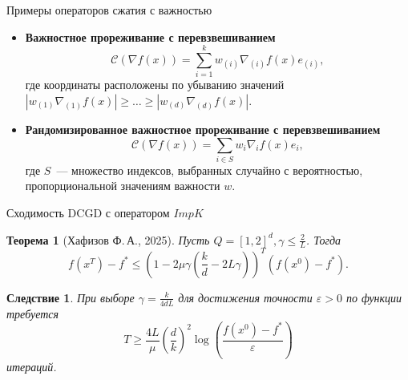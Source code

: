\documentclass{beamer}
\newtheorem{mytheorem}{Теорема}
\newtheorem{mycorollary}{Следствие}
\begin{document}
\begin{frame}{Примеры операторов сжатия с важностью}
    \begin{itemize}
        \item \textbf{Важностное прореживание с перевзвешиванием}\\
        \begin{equation}
            \mathcal{C}(\nabla f(x)) = \sum_{i=1}^k w_{(i)} \nabla_{(i)} f(x) e_{(i)},
        \end{equation}
        где координаты расположены по убыванию значений $|w_{(1)} \nabla_{(1)} f(x)| \geq \dots \geq |w_{(d)} \nabla_{(d)} f(x)|$.
        \item \textbf{Рандомизированное важностное прореживание с перевзвешиванием}\\
        \begin{equation}
            \mathcal{C}(\nabla f(x)) = \sum_{i \in S} w_i \nabla_i f(x) e_i,
        \end{equation}
        где $S$~--- множество индексов, выбранных случайно с вероятностью, пропорциональной значениям важности $w$.
    \end{itemize}
\end{frame}


\begin{frame}{Сходимость DCGD с оператором $ImpK$}
    \begin{mytheorem}[Хафизов Ф.\,А., 2025]
        Пусть $Q = [1, 2]^d, \gamma \leq \frac{2}{L}$. Тогда
        \begin{equation}
            f(x^T) - f^* \leq \left(1 - 2\mu \gamma \left(\frac{k}{d} - 2 L \gamma\right)\right)^T (f(x^0) - f^*).
        \end{equation}
    \end{mytheorem}
    \begin{mycorollary}
        При выборе $\gamma = \frac{k}{4dL}$ для достижения точности $\varepsilon > 0$ по функции требуется
        \begin{equation}
            T \geq \frac{4L}{\mu} \left(\frac{d}{k}\right)^2 \log\left(\frac{f(x^0) - f^*}{\varepsilon}\right)
        \end{equation}
        итераций.
    \end{mycorollary}
\end{frame}
\end{document}
